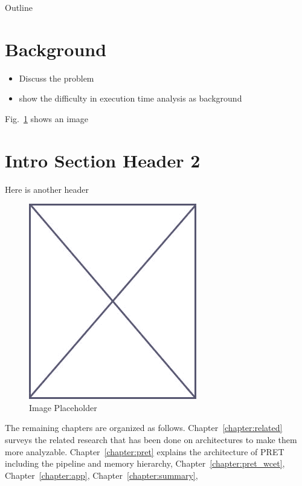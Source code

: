 Outline


\section{Background}
\label{sec:background}
\begin{itemize}
  \item Discuss the problem
  \item show the difficulty in execution time analysis as background
\end{itemize}


Fig.~\ref{fig:placeholder_intro} shows an image

\section{Intro Section Header 2}
\label{sec:intro_sec_2}

Here is another header




\label{bookmark:timing_anomalies}

\begin{figure}
\begin{center}
\vspace{-32pt}
\includegraphics[scale=.45]{figs/placeholder}
\end{center}
\vspace{-12pt}
\caption{Image Placeholder}
\label{fig:placeholder_intro}
\end{figure}

The remaining chapters are organized as follows. 
Chapter~\ref{chapter:related} surveys the related research that has been done on architectures to make them more analyzable.
Chapter~\ref{chapter:pret} explains the architecture of PRET including the \thdint pipeline and memory hierarchy, Chapter~\ref{chapter:pret_wcet}, Chapter~\ref{chapter:app}, Chapter~\ref{chapter:summary},


